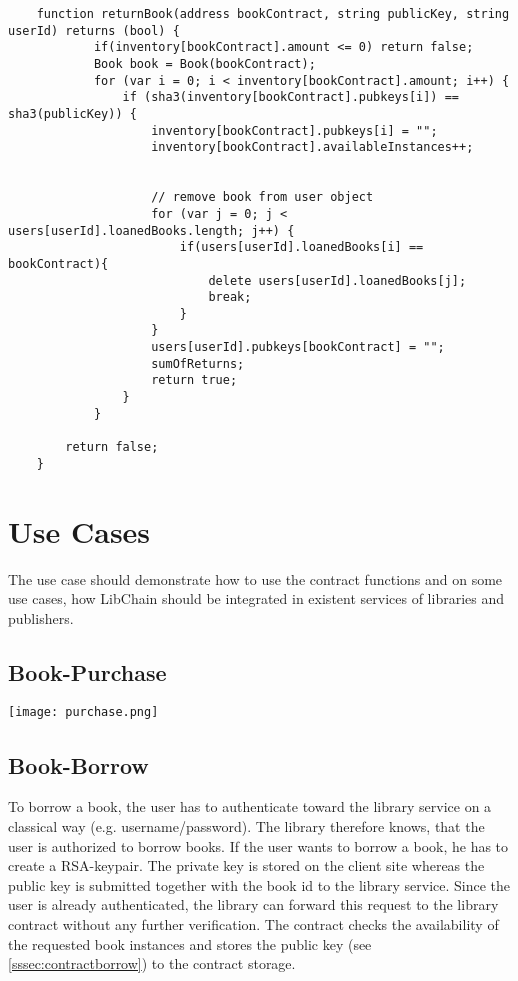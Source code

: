\begin{lstlisting}
	function returnBook(address bookContract, string publicKey, string userId) returns (bool) {
    		if(inventory[bookContract].amount <= 0) return false;
    		Book book = Book(bookContract);
            for (var i = 0; i < inventory[bookContract].amount; i++) {
                if (sha3(inventory[bookContract].pubkeys[i]) == sha3(publicKey)) {
                    inventory[bookContract].pubkeys[i] = "";
                    inventory[bookContract].availableInstances++;


                    // remove book from user object
                    for (var j = 0; j < users[userId].loanedBooks.length; j++) {
                        if(users[userId].loanedBooks[i] == bookContract){
                            delete users[userId].loanedBooks[j];
                            break;
                        }
                    }
                    users[userId].pubkeys[bookContract] = "";
                    sumOfReturns;
                    return true;
                }
            }

        return false;
    }
\end{lstlisting}

\section{Use Cases}
The use case should demonstrate how to use the contract functions and on some use cases, how LibChain should be integrated in existent services of libraries and publishers.

\subsection{Book-Purchase}
\vspace{0.3cm}
\texttt{[image: purchase.png]}
\subsection{Book-Borrow}
To borrow a book, the user has to authenticate toward the library service on a classical way (e.g. username/password). The library therefore knows, that the user is authorized to borrow books. If the user wants to borrow a book, he has to create a RSA-keypair. The private key is stored on the client site whereas the public key is submitted together with the book id to the library service.
Since the user is already authenticated, the library can forward this request to the library contract without any further verification.
The contract checks the availability of the requested book instances and stores the public key (see \ref{sssec:contractborrow}) to the contract storage.

